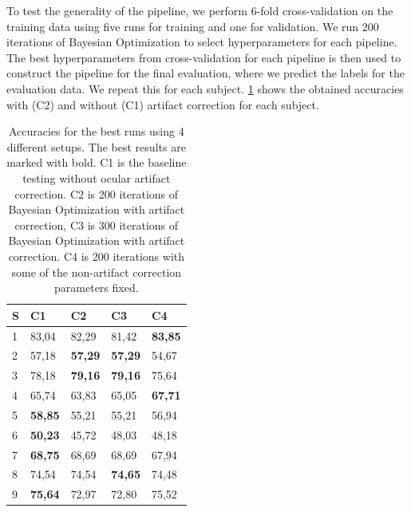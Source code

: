 To test the generality of the pipeline, we perform 6-fold cross-validation on the training data using five runs for training and one for validation. We run 200 iterations of Bayesian Optimization to select hyperparameters for each pipeline. The best hyperparameters from cross-validation for each pipeline is then used to construct the pipeline for the final evaluation, where we predict the labels for the evaluation data. We repeat this for each subject. 
\cref{fig:results} shows the obtained accuracies with (C2) and without (C1) artifact correction for each subject.

\begin{table}[H]
	\begin{tabular}{@{}l|llll@{}} \toprule
		S					  & C1             & C2             & C3             & C4             \\ \midrule
		1                     & 83,04          & 82,29          & 81,42          & \textbf{83,85} \\
		2                     & 57,18          & \textbf{57,29} & \textbf{57,29} & 54,67 		  \\
		3                     & 78,18          & \textbf{79,16} & \textbf{79,16} & 75,64          \\
		4                     & 65,74          & 63,83          & 65,05          & \textbf{67,71} \\
		5                     & \textbf{58,85} & 55,21          & 55,21          & 56,94          \\
		6                     & \textbf{50,23} & 45,72          & 48,03          & 48,18          \\
		7                     & \textbf{68,75} & 68,69          & 68,69          & 67,94          \\
		8                     & 74,54          & 74,54          & \textbf{74,65} & 74,48          \\
		9                     & \textbf{75,64} & 72,97          & 72,80          & 75,52 		  \\ \bottomrule
	\end{tabular}
	\centering
	\caption{Accuracies for the best runs using 4 different setups. The best results are marked with bold. C1 is the baseline testing without ocular artifact correction. C2 is 200 iterations of Bayesian Optimization with artifact correction, C3 is 300 iterations of Bayesian Optimization with artifact correction. C4 is 200 iterations with some of the non-artifact correction parameters fixed.}
	\label{fig:results}
\end{table}

